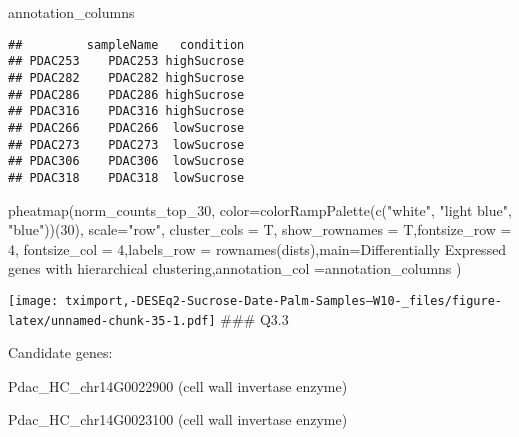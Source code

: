 \documentclass[
]{article}
\newenvironment{Shaded}{\begin{snugshade}}{\end{snugshade}}
\newcommand{\AttributeTok}[1]{\textcolor[rgb]{0.77,0.63,0.00}{#1}}
\newcommand{\ConstantTok}[1]{\textcolor[rgb]{0.00,0.00,0.00}{#1}}
\newcommand{\DecValTok}[1]{\textcolor[rgb]{0.00,0.00,0.81}{#1}}
\newcommand{\FunctionTok}[1]{\textcolor[rgb]{0.00,0.00,0.00}{#1}}
\newcommand{\NormalTok}[1]{#1}
\newcommand{\OtherTok}[1]{\textcolor[rgb]{0.56,0.35,0.01}{#1}}
\newcommand{\SpecialCharTok}[1]{\textcolor[rgb]{0.00,0.00,0.00}{#1}}
\newcommand{\StringTok}[1]{\textcolor[rgb]{0.31,0.60,0.02}{#1}}
\begin{document}
\begin{Shaded}
\begin{Highlighting}[]
\NormalTok{annotation\_columns}
\end{Highlighting}
\end{Shaded}

\begin{verbatim}
##         sampleName   condition
## PDAC253    PDAC253 highSucrose
## PDAC282    PDAC282 highSucrose
## PDAC286    PDAC286 highSucrose
## PDAC316    PDAC316 highSucrose
## PDAC266    PDAC266  lowSucrose
## PDAC273    PDAC273  lowSucrose
## PDAC306    PDAC306  lowSucrose
## PDAC318    PDAC318  lowSucrose
\end{verbatim}

\begin{Shaded}
\end{Shaded}

\begin{Shaded}
\begin{Highlighting}[]
\FunctionTok{pheatmap}\NormalTok{(norm\_counts\_top\_30, }\AttributeTok{color=}\FunctionTok{colorRampPalette}\NormalTok{(}\FunctionTok{c}\NormalTok{(}\StringTok{"white"}\NormalTok{, }\StringTok{"light blue"}\NormalTok{, }\StringTok{"blue"}\NormalTok{))(}\DecValTok{30}\NormalTok{), }\AttributeTok{scale=}\StringTok{"row"}\NormalTok{, }\AttributeTok{cluster\_cols =}\NormalTok{ T, }\AttributeTok{show\_rownames =}\NormalTok{ T,}\AttributeTok{fontsize\_row =} \DecValTok{4}\NormalTok{, }\AttributeTok{fontsize\_col =} \DecValTok{4}\NormalTok{,}\AttributeTok{labels\_row =} \FunctionTok{rownames}\NormalTok{(dists),}\AttributeTok{main=}\StringTok{\textquotesingle{}Differentially Expressed genes with hierarchical clustering\textquotesingle{}}\NormalTok{,}\AttributeTok{annotation\_col =}\NormalTok{annotation\_columns )}
\end{Highlighting}
\end{Shaded}

\texttt{[image: tximport,-DESEq2-Sucrose-Date-Palm-Samples--W10-\_files/figure-latex/unnamed-chunk-35-1.pdf]}
\#\#\# Q3.3

Candidate genes:

Pdac\_HC\_chr14G0022900 (cell wall invertase enzyme)

Pdac\_HC\_chr14G0023100 (cell wall invertase enzyme)
\end{document}
